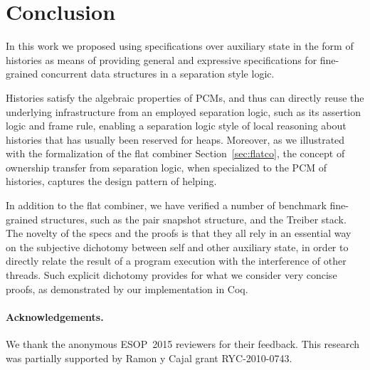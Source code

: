 \section{Conclusion}
\label{sec:conclusion}

In this work we proposed using specifications over auxiliary state in
the form of histories as means of providing general and expressive
specifications for fine-grained concurrent data structures in a
separation style logic.


Histories satisfy the algebraic properties of PCMs, and thus can
directly reuse the underlying infrastructure from an employed
separation logic, such as its assertion logic and frame rule,
enabling a separation logic style of local reasoning about histories
that has usually been reserved for heaps.
%
Moreover, as we illustrated with the formalization of the flat
combiner Section~\ref{sec:flatco}, the concept of ownership transfer
from separation logic, when specialized to the PCM of histories,
captures the design pattern of helping.
%
%

In addition to the flat combiner, we have verified a number of
benchmark fine-grained structures, such as the pair snapshot
structure, and the Treiber stack. The novelty of
the specs and the proofs is that they all rely in an essential
way on the subjective dichotomy between self and other auxiliary
state, in order to directly relate the result of a program execution
with the interference of other threads.
%
Such explicit dichotomy provides for what we consider very concise
proofs, as demonstrated by our implementation in Coq.

\paragraph{Acknowledgements.}
%
We thank the anonymous ESOP~2015 reviewers for their feedback. This
research was partially supported by Ramon y Cajal grant RYC-2010-0743.

